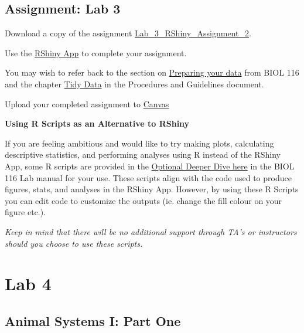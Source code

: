 \documentclass[
]{book}
\begin{document}
\hypertarget{assignment-lab-3}{%
\chapter*{Assignment: Lab 3}\label{assignment-lab-3}}

Download a copy of the assignment \href{https://osf.io/download/cr9py}{Lab\_3\_RShiny\_Assignment\_2}.

Use the \href{https://openscience.ok.ubc.ca/shiny/BIOL-116/}{RShiny App} to complete your assignment.

You may wish to refer back to the section on \href{https://ubco-biology.github.io/BIOL-116-Lab-Manual/preparing-your-data.html}{Preparing your data} from BIOL 116 and the chapter \href{https://ubco-biology.github.io/Procedures-and-Guidelines/tidy-data.html}{Tidy Data} in the Procedures and Guidelines document.

Upload your completed assignment to \href{https://canvas.ubc.ca/}{Canvas}

\textbf{Using R Scripts as an Alternative to RShiny}

If you are feeling ambitious and would like to try making plots, calculating descriptive statistics, and performing analyses using R instead of the RShiny App, some R scripts are provided in the \href{https://ubco-biology.github.io/BIOL-116-Lab-Manual/lab-7-activity.html}{Optional Deeper Dive here} in the BIOL 116 Lab manual for your use. These scripts align with the code used to produce figures, stats, and analyses in the RShiny App. However, by using these R Scripts you can edit code to customize the outputs (ie. change the fill colour on your figure etc.).

\emph{Keep in mind that there will be no additional support through TA's or instructors should you choose to use these scripts.}

\hypertarget{part-lab-4}{%
\part*{Lab 4}\label{part-lab-4}}

\hypertarget{animal-systems-i-part-one}{%
\chapter*{Animal Systems I: Part One}\label{animal-systems-i-part-one}}
\end{document}
